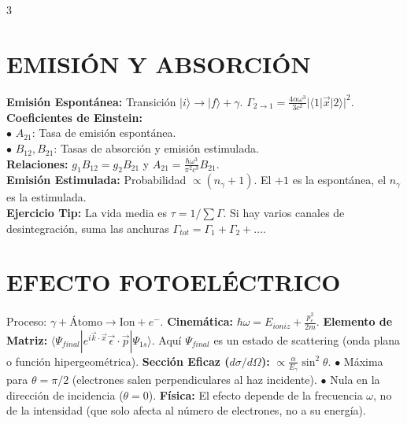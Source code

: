 \documentclass[8pt,a4paper,fleqn]{extarticle} %
\begin{document}
\begin{multicols}{3}
\section{EMISIÓN Y ABSORCIÓN}
\textbf{Emisión Espontánea:} Transición $|i\rangle \to |f\rangle + \gamma$.
$\Gamma_{2\to 1} = \frac{4\alpha \omega^3}{3c^2} |\langle 1 | \vec{x} | 2 \rangle|^2$.\\
\textbf{Coeficientes de Einstein:}
\\$\bullet$ $A_{21}$: Tasa de emisión espontánea.\\
$\bullet$ $B_{12}, B_{21}$: Tasas de absorción y emisión estimulada.\\
\textbf{Relaciones:} $g_1 B_{12} = g_2 B_{21}$ y $A_{21} = \frac{\hbar \omega^3}{\pi^2 c^3} B_{21}$.\\
\textbf{Emisión Estimulada:} Probabilidad $\propto (n_\gamma + 1)$. El $+1$ es la espontánea, el $n_\gamma$ es la estimulada.\\
\textbf{Ejercicio Tip:} La vida media es $\tau = 1/\sum \Gamma$. Si hay varios canales de desintegración, suma las anchuras $\Gamma_{tot} = \Gamma_1 + \Gamma_2 + \dots$.

\section{EFECTO FOTOELÉCTRICO}
Proceso: $\gamma + \text{Átomo} \to \text{Ion} + e^-$.
\textbf{Cinemática:} $\hbar \omega = E_{ioniz} + \frac{p_e^2}{2m}$.
\textbf{Elemento de Matriz:} $\langle \Psi_{final} | e^{i\vec{k} \cdot \vec{x}} \vec{\epsilon} \cdot \vec{p} | \Psi_{1s} \rangle$.
Aquí $\Psi_{final}$ es un estado de scattering (onda plana o función hipergeométrica).
\textbf{Sección Eficaz ($d\sigma/d\Omega$):} $\propto \frac{\alpha}{E_\gamma} \sin^2 \theta$.
$\bullet$ Máxima para $\theta = \pi/2$ (electrones salen perpendiculares al haz incidente).
$\bullet$ Nula en la dirección de incidencia ($\theta = 0$).
\textbf{Física:} El efecto depende de la frecuencia $\omega$, no de la intensidad (que solo afecta al número de electrones, no a su energía).


\end{multicols}
\end{document}
